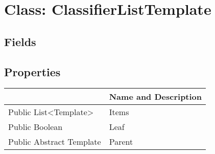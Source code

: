 \documentclass[11pt, oneside, a4paper]{book}
\begin{document}
\hypertarget{SoftwareEngineeringTools.{}Documentation.{}ClassifierListTemplate}{}
\section{Class: ClassifierListTemplate}

\subsection{Fields}

\subsection{Properties}
\begin{center}
\begin{tabular}{| p{3cm} | p{12cm} | }
\hline
\textbf{ } & \textbf{ Name and Description}\\
\hline
 Public  List<Template> &  Items\hypertarget{SoftwareEngineeringTools.{}Documentation.{}ClassifierListTemplate.{}Items}{}\\
\hline
 Public  Boolean &  Leaf\hypertarget{SoftwareEngineeringTools.{}Documentation.{}ClassifierListTemplate.{}Leaf}{}\\
\hline
 Public  Abstract  Template &  Parent\hypertarget{SoftwareEngineeringTools.{}Documentation.{}ClassifierListTemplate.{}Parent}{}\\
\hline
\end{tabular}
\end{center}
\end{document}
